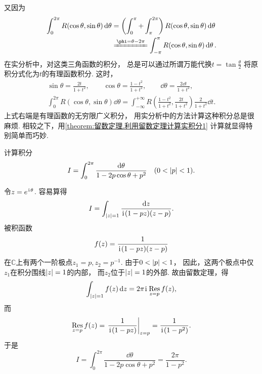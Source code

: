 又因为\begin{align*}
	\int_0^{2\pi} R(\cos\theta,\sin\theta) \dd{\theta}
	&= \left( \int_0^\pi + \int_{\pi}^{2\pi} \right) R(\cos\theta,\sin\theta) \dd{\theta} \\
	&\xlongequal{\phi=\theta-2\pi} \int_{-\pi}^\pi R(\cos\theta,\sin\theta) \dd{\theta}.
\end{align*}
在实分析中，对这类三角函数的积分，
总是可以通过所谓万能代换\(t = \tan\frac{\theta}{2}\)
将原积分式化为\(t\)的有理函数积分.
这时，\begin{gather*}
	\sin\theta = \frac{2t}{1+t^2},
	\qquad
	\cos\theta = \frac{1-t^2}{1+t^2},
	\qquad
	\dd{\theta} = \frac{2 \dd{t}}{1+t^2}, \\
	\int_0^{2\pi} R(\cos\theta,\sin\theta) \dd{\theta}
	= \int_{-\infty}^{+\infty} R\left(\frac{1-t^2}{1+t^2},\frac{2t}{1+t^2}\right) \frac{2}{1+t^2} \dd{t}.
\end{gather*}
上式右端是有理函数的无穷限广义积分，
用实分析中的方法计算这种积分总是很麻烦.
相较之下，用\cref{theorem:留数定理.利用留数定理计算实积分1} 计算就显得特别简单而巧妙.

\begin{example}[泊松积分]\label{example:留数定理.泊松积分}
计算积分\begin{equation*}
	I = \int_0^{2\pi} \frac{\dd{\theta}}{1-2p\cos\theta+p^2} \quad(0<\abs{p}<1).
\end{equation*}
\begin{solution}
令\(z=e^{\kern1pt\mathrm{i}\kern1pt\theta}\).
容易算得\begin{equation*}
	I = \int_{\abs{z}=1} \frac{\dd{z}}{\kern1pt\mathrm{i}\kern1pt(1-pz)(z-p)}.
\end{equation*}
被积函数\begin{equation*}
	f(z) = \frac{1}{\kern1pt\mathrm{i}\kern1pt(1-pz)(z-p)}
\end{equation*}在\(\mathbb{C}\)上有两个一阶极点\(z_1=p, z_2=p^{-1}\).
由于\(0<\abs{p}<1\)，
因此，这两个极点中仅\(z_1\)在积分围线\(\abs{z}=1\)的内部，
而\(z_2\)位于\(\abs{z}=1\)的外部.
故由留数定理，得\begin{equation*}
	\int_{\abs{z}=1} f(z) \dd{z}
	= 2\pi\kern1pt\mathrm{i}\kern1pt \operatorname*{Res}_{z=p} f(z),
\end{equation*}而\begin{equation*}
	\Res_{z=p} f(z)
	= \eval{ \frac{1}{\iu(1-pz)} }_{z=p}
	= \frac{1}{\iu(1-p^2)}.
\end{equation*}
于是\begin{equation*}
	I = \int_0^{2\pi} \frac{\dd{\theta}}{1-2p\cos\theta+p^2}
	= \frac{2\pi}{1-p^2}.
\end{equation*}
\end{solution}
\end{example}

